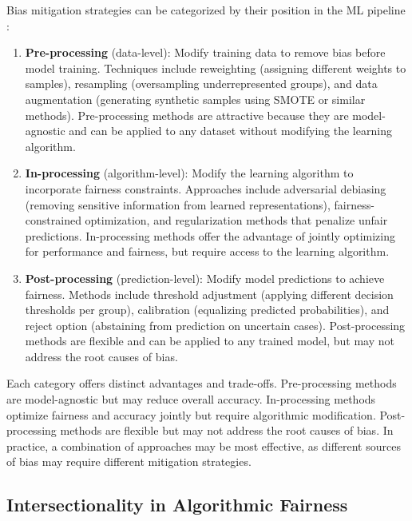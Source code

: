 Bias mitigation strategies can be categorized by their position in the 
ML pipeline \cite{friedler2019}:

\begin{enumerate}[leftmargin=*]
    \item \textbf{Pre-processing} (data-level): Modify training data to 
          remove bias before model training. Techniques include reweighting 
          (assigning different weights to samples), resampling (oversampling 
          underrepresented groups), and data augmentation (generating synthetic 
          samples using SMOTE or similar methods). Pre-processing methods are 
          attractive because they are model-agnostic and can be applied to any 
          dataset without modifying the learning algorithm.
    
    \item \textbf{In-processing} (algorithm-level): Modify the learning 
          algorithm to incorporate fairness constraints. Approaches include 
          adversarial debiasing (removing sensitive information from learned 
          representations), fairness-constrained optimization, and 
          regularization methods that penalize unfair predictions. In-processing 
          methods offer the advantage of jointly optimizing for performance 
          and fairness, but require access to the learning algorithm.
    
    \item \textbf{Post-processing} (prediction-level): Modify model 
          predictions to achieve fairness. Methods include threshold adjustment 
          (applying different decision thresholds per group), calibration 
          (equalizing predicted probabilities), and reject option (abstaining 
          from prediction on uncertain cases). Post-processing methods are 
          flexible and can be applied to any trained model, but may not address 
          the root causes of bias.
\end{enumerate}

Each category offers distinct advantages and trade-offs. Pre-processing 
methods are model-agnostic but may reduce overall accuracy. In-processing 
methods optimize fairness and accuracy jointly but require algorithmic 
modification. Post-processing methods are flexible but may not address 
the root causes of bias. In practice, a combination of approaches may be 
most effective, as different sources of bias may require different 
mitigation strategies.

\subsection{Intersectionality in Algorithmic Fairness}

